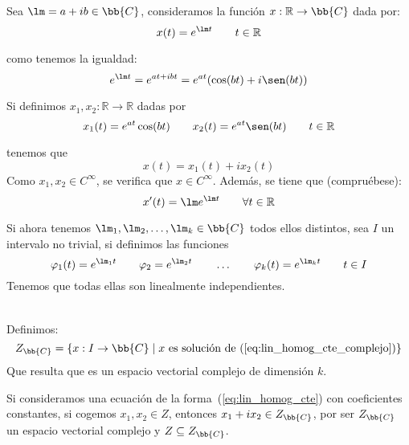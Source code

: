 \begin{ejemplo}
    Sea $\lm = a+ib\in \bb{C}$, consideramos la función $x:\mathbb{R}\rightarrow\bb{C}$ dada por:
    \begin{equation*}
        x(t) = e^{\lm t} \qquad t\in \mathbb{R}
    \end{equation*}

    como tenemos la igualdad:
    \begin{equation*}
        e^{\lm t} = e^{at + ibt} = e^{at}(\cos (bt) + i\sen (bt))
    \end{equation*}

    Si definimos $x_1,x_2:\mathbb{R}\rightarrow\mathbb{R}$ dadas por
    \begin{equation*}
        x_1(t) = e^{at} \cos(bt) \qquad x_2(t) = e^{at} \sen(bt) \qquad t\in \mathbb{R}
    \end{equation*}

    tenemos que
    \begin{equation*}
        x(t) = x_1(t) + ix_2(t)
    \end{equation*}
    Como $x_1,x_2\in C^\infty$, se verifica que $x\in C^\infty$. Además, se tiene que (compruébese):
    \begin{equation*}
        x'(t) = \lm e^{\lm t} \qquad \forall t\in \mathbb{R}
    \end{equation*}
\end{ejemplo}

\begin{observacion}
    Si ahora tenemos $\lm_1,\lm_2,\ldots,\lm_k\in \bb{C}$ todos ellos distintos, sea $I$ un intervalo no trivial, si definimos las funciones
    \begin{equation*}
        \varphi_1(t) = e^{\lm_1t} \qquad \varphi_2=e^{\lm_2 t} \qquad \ldots \qquad \varphi_k(t) = e^{\lm_kt} \qquad t\in I
    \end{equation*}
    Tenemos que todas ellas son linealmente independientes.
\end{observacion}~\\

\noindent
Definimos:
\begin{equation*}
    Z_{\bb{C}} = \{x:I\rightarrow\bb{C} \mid x \text{\ es solución de~(\ref{eq:lin_homog_cte_complejo})}\}
\end{equation*}
Que resulta que es un espacio vectorial complejo de dimensión $k$.\\

\begin{observacion}
    Si consideramos una ecuación de la forma~(\ref{eq:lin_homog_cte}) con coeficientes constantes, si cogemos $x_1,x_2\in Z$, entonces $x_1 + ix_2 \in Z_{\bb{C}}$, por ser $Z_{\bb{C}}$ un espacio vectorial complejo y $Z\subseteq Z_{\bb{C}}$.\\

\end{observacion}

